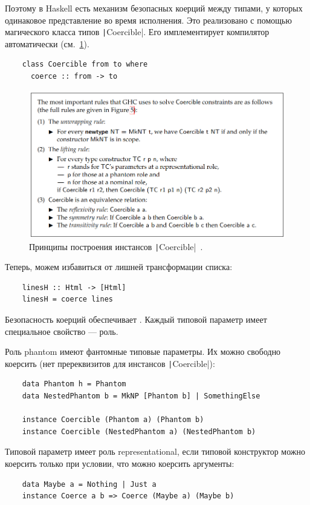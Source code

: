 Поэтому в Haskell есть механизм безопасных коерций между типами, у которых одинаковое представление во время исполнения.
Это реализовано с помощью магического класса типов \texttt|Coercible|.
Его имплементирует компилятор автоматически (см.~\ref{fig:coersions}).
\begin{verbatim}
    class Coercible from to where
      coerce :: from -> to
\end{verbatim}

\begin{figure}
    \centering
    \includegraphics[width=\linewidth]{figs/coersions}
    \caption{Принципы построения инстансов \texttt|Coercible|~\cite{breitner2014safe}.}
    \label{fig:coersions}
\end{figure}

Теперь, можем избавиться от лишней трансформации списка:
\begin{verbatim}
    linesH :: Html -> [Html]
    linesH = coerce lines
\end{verbatim}

Безопасность коерций обеспечивает .
Каждый типовой параметр имеет специальное свойство --- роль.

Роль phantom имеют фантомные типовые параметры.
Их можно свободно коерсить (нет пререквизитов для инстансов \texttt|Coercible|):
\begin{verbatim}
    data Phantom h = Phantom
    data NestedPhantom b = MkNP [Phantom b] | SomethingElse

    instance Coercible (Phantom a) (Phantom b)
    instance Coercible (NestedPhantom a) (NestedPhantom b)
\end{verbatim}

Типовой параметр имеет роль representational, если типовой конструктор можно коерсить только при условии, что можно коерсить аргументы:
\begin{verbatim}
    data Maybe a = Nothing | Just a
    instance Coerce a b => Coerce (Maybe a) (Maybe b)
\end{verbatim}

